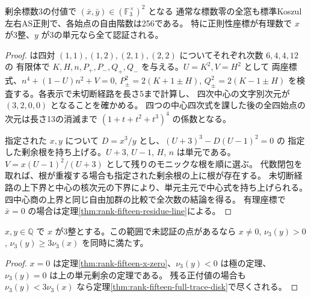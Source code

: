 \begin{theorem}\label{thm:rank-fifteen-unit-residues}
剰余標数3の付値で $(\bar x,\bar y)\in(\mathbb F_3^\times)^2$ となる
通常な標数零の全窓も標準Koszul左右AS正則で、各始点の自由階数は256である。
特に正則性座標が有理数で $x$ が3整、$y$ が3の単元なら全て認証される。
\end{theorem}
\begin{proof}
 は四対
$(1,1),(1,2),(2,1),(2,2)$ についてそれぞれ次数 $6,4,4,12$ の
有限体で $K,H,n,P_+,P_-,Q_+,Q_-$ を与える。$U=K^2,V=H^2$ として
両座標式、$n^4+(1-U)n^2+V=0$, $P_\pm^2=2(K+1\pm H)$,
$Q_\pm^2=2(K-1\pm H)$ を検査する。各表示で未切断経路を長さ5まで計算し、
四次中心の文字別次元が $(3,2,0,0)$ となることを確かめる。
四つの中心四次式を課した後の全四始点の次元は長さ13の消滅まで
$(1+t+t^2+t^3)^4$ の係数となる。

指定された $x,y$ について $D=x^3/y$ とし、$(U+3)^3-D(U-1)^2=0$ の
指定した剰余根を持ち上げる。$U+3$, $U-1$, $H$, $n$ は単元である。
$V=x(U-1)^2/(U+3)$ として残りのモニックな根を順に選ぶ。
代数閉包を取れば、根が重複する場合も指定された剰余根の上に根が存在する。
未切断経路の上下界と中心の核次元の下界により、単元主元で中心式を持ち上げられる。
四中心商の上界と同じ自由加群の比較で全次数の結論を得る。
有理座標で $\bar x=0$ の場合は定理\ref{thm:rank-fifteen-residue-line}による。
\end{proof}

\begin{corollary}
$x,y\in\mathbb Q$ で $x$ が3整とする。この範囲で未認証の点があるなら
$x\ne0$, $\nu_3(y)>0$, $\nu_3(y)\ge3\nu_3(x)$ を同時に満たす。
\end{corollary}
\begin{proof}
$x=0$ は定理\ref{thm:rank-fifteen-x-zero}、$\nu_3(y)<0$ は極の定理、
$\nu_3(y)=0$ は上の単元剰余の定理である。
残る正付値の場合も $\nu_3(y)<3\nu_3(x)$ なら定理\ref{thm:rank-fifteen-full-trace-disk}で尽くされる。
\end{proof}
